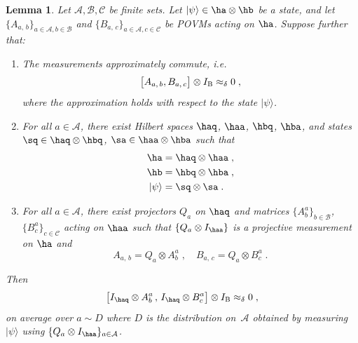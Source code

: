 \documentclass[11pt]{article}
\newtheorem{lemma}[theorem]{Lemma}
\theoremstyle{definition}
\newcommand{\ket}[1]{|#1\rangle}
\newcommand{\Id}{\ensuremath{I}}
\newcommand{\mA}{\ensuremath{\mathcal{A}}}
\newcommand{\mB}{\ensuremath{\mathcal{B}}}
\newcommand{\mC}{\ensuremath{\mathcal{C}}}
\newcommand{\labelstyle}[1]{\ensuremath{\textsc{#1}}\xspace}
\newcommand{\bob}{\labelstyle{B}}
\renewcommand{\cal}[1]{\mathcal{#1}}
\begin{document}
\begin{lemma}\label{lem:commutation-simplification}
  Let $\mA,\mB,\mC$ be finite sets.
  Let $\ket{\psi} \in \ha \otimes \hb$ be a state, and let $\{A_{a,\, b}\}_{a
    \in \mA, b \in \cal{B}}$ and $\{B_{a,\, c}\}_{a \in \mA, c \in \cal{C}}$ be
  POVMs acting on $\ha$.
  Suppose further that:
  \begin{enumerate}
  \item The measurements approximately commute,
    i.e.\, \label{item:almost-compute}
    \begin{equation*}
      \bigl[ A_{a,\, b}, B_{a,\, c} \bigr] \otimes \Id_\bob \approx_\delta 0\;,
    \end{equation*}
    where the approximation holds with respect to the state $\ket{\psi}$. 
  \item For all $a \in \cal{A}$, there exist Hilbert spaces $\haq$, $\haa$,
    $\hbq$, $\hba$, and states $\sq \in \haq \otimes
    \hbq$, $\sa \in \haa \otimes \hba$ such that
    \begin{align*}
      \ha & = \haq \otimes \haa\;,\\
      \hb & = \hbq \otimes \hba\;,\\
      \ket{\psi} & = \sq \otimes \sa\;.
    \end{align*}
  \item \label{item:weird-decomposition} For all $a \in \cal{A}$, there exist
    projectors $Q_a$ on $\haq$ and matrices $\{A^{a}_b\}_{b \in
      \cal{B}}$, $\{B^{a}_c\}_{c \in \cal{C}}$ acting on $\haa$
    such that $\{Q_a \otimes \Id_{\haa}\}$ is a projective
    measurement on $\ha$ and
    \begin{equation*}
      A_{a, \, b} = Q_a \otimes A^a_b\;, \quad
      B_{a, \, c} = Q_a \otimes B^a_c\;.
    \end{equation*}
  \end{enumerate}
  Then
  \begin{equation*}
    \bigl[ \Id_{\haq} \otimes A^{a}_b \,,\, \Id_{\haq}
    \otimes B^{a}_c \bigr] \otimes \Id_\bob \approx_\delta 0\;,
  \end{equation*}
  on average over $a \sim D$ where $D$ is the distribution on~$\cal{A}$ obtained
  by measuring $\ket{\psi}$ using $\{ Q_a \otimes I_{\haa} \}_{a \in \cal{A}}$.
\end{lemma}
 
\end{document}
